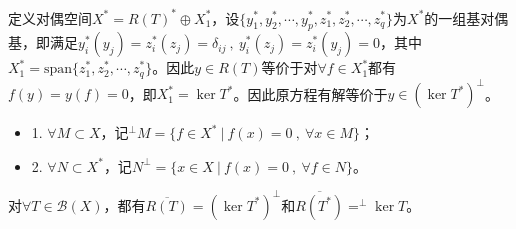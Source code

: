定义对偶空间$X^*=R(T)^*\oplus X_1^*$，设$\{y_1^*,y_2^*,\cdots,y_p^*,z_1^*,z_2^*,\cdots,z_q^*\}$为$X^*$的一组基对偶基，即满足$y_i^*(y_j)=z_i^*(z_j)=\delta_{ij} \ , \ y_i^*(z_j)=z_i^*(y_j)=0$，其中$X_1^*=\text{span}\{z_1^*,z_2^*,\cdots,z_q^*\}$。因此$y \in R(T)$等价于对$\forall f \in X_1^*$都有$f(y)=y(f)=0$，即$X_1^*=\ker T^*$。因此原方程有解等价于$y \in (\ker T^*)^{\perp}$。
\begin{definition}
\begin{itemize}
\item 1. $\forall M \subset X$，记$^{\perp}M=\{f \in X^* \ | \ f(x)=0 \ , \ \forall x \in M\}$；
\item 2. $\forall N \subset X^*$，记$N^{\perp}=\{x \in X \ | \ f(x)=0 \ , \ \forall f \in N\}$。
\end{itemize}
\end{definition}
\begin{lemma}\label{lemma:crazy}
对$\forall T \in \mathscr{B}(X)$，都有$\overline{R(T)}=(\ker T^*)^{\perp}$和$\overline{R(T^*)}=^{\perp}\ker T$。
\end{lemma}
